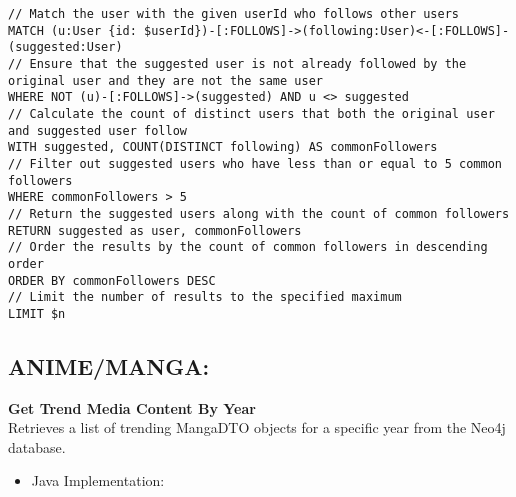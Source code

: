 \begin{mdframed}[style=customstyle]
\begin{lstlisting}[language=Cypher]
// Match the user with the given userId who follows other users
MATCH (u:User {id: $userId})-[:FOLLOWS]->(following:User)<-[:FOLLOWS]-(suggested:User) 
// Ensure that the suggested user is not already followed by the original user and they are not the same user
WHERE NOT (u)-[:FOLLOWS]->(suggested) AND u <> suggested 
// Calculate the count of distinct users that both the original user and suggested user follow
WITH suggested, COUNT(DISTINCT following) AS commonFollowers 
// Filter out suggested users who have less than or equal to 5 common followers
WHERE commonFollowers > 5 
// Return the suggested users along with the count of common followers
RETURN suggested as user, commonFollowers 
// Order the results by the count of common followers in descending order
ORDER BY commonFollowers DESC 
// Limit the number of results to the specified maximum
LIMIT $n\end{lstlisting}
\end{mdframed}

\subsection*{ANIME/MANGA:}
\textbf{Get Trend Media Content By Year}\\
Retrieves a list of trending MangaDTO objects for a specific year from the Neo4j database.
\begin{itemize}
    \item Java Implementation:
\end{itemize}

